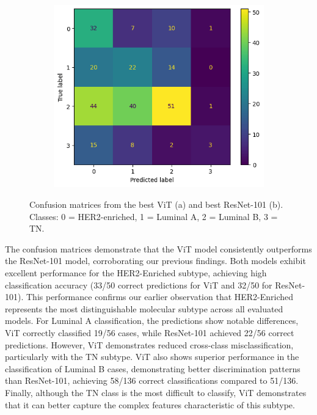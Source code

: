 \documentclass[a4paper,10pt]{book}
\begin{document}
\begin{figure}[h!]
\begin{subfigure}[t]{0.48\textwidth}
        \includegraphics[width=\textwidth]{reports/assets/CM-42-ResNet.png}
        \caption{}
        \label{fig:cm_resnet}
    \end{subfigure}
    \caption[Confusion Matrices Best ViT vs. Best ResNet]{Confusion matrices from the best ViT (a) and best ResNet-101 (b). Classes: 0 = HER2-enriched, 1 = Luminal A, 2 = Luminal B, 3 = TN.}
    \label{fig:cm_vit_resnet}
\end{figure}

The confusion matrices demonstrate that the ViT model consistently outperforms the ResNet-101 model, corroborating our previous findings. Both models exhibit excellent performance for the HER2-Enriched subtype, achieving high classification accuracy (33/50 correct predictions for ViT and 32/50 for ResNet-101). This performance confirms our earlier observation that HER2-Enriched represents the most distinguishable molecular subtype across all evaluated models. For Luminal A classification, the predictions show notable differences, ViT correctly classified 19/56 cases, while ResNet-101 achieved 22/56 correct predictions. However, ViT demonstrates reduced cross-class misclassification, particularly with the TN subtype. ViT also shows superior performance in the classification of Luminal B cases, demonstrating better discrimination patterns than ResNet-101, achieving 58/136 correct classifications compared to 51/136. Finally, although the TN class is the most difficult to classify, ViT demonstrates that it can better capture the complex features characteristic of this subtype.
\end{document}
